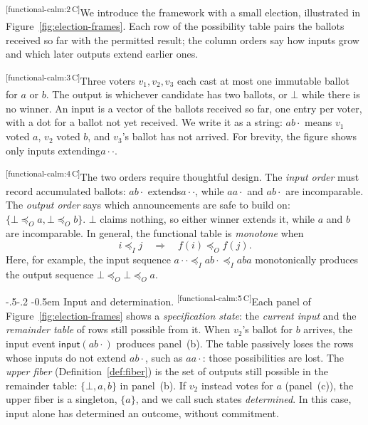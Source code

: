 \documentclass[sigconf]{cidr-2027}
\makeatletter
\theoremstyle{remark}
\renewcommand\paragraph{\@startsection{paragraph}{4}{\z@}%
  {-.5\baselineskip \@plus -2\p@ \@minus -.2\p@}%
  {-0.5em}%
  {\normalfont\bfseries}}
\newcommand{\InputOrd}{\preceq_I}
\newcommand{\OutputOrd}{\preceq_O}
\newcommand{\commitment}{commitment\xspace}
\newcommand{\inrel}{extends\xspace}          %
\newcommand{\inrelpart}{extending\xspace}    %
\newcommand{\ingrow}{grow\xspace}            %
\newcommand{\outrel}{extends\xspace}          %
\newcommand{\outrelbase}{extend\xspace}       %
\newcommand{\cxtag}[2]{\textsuperscript{\textsf{\tiny[#1\,#2]}}}
\makeatother
\begin{document}
\color{black!45}\cxtag{functional-calm:2}{C}We introduce the framework with a small election, illustrated in
Figure~\ref{fig:election-frames}.  Each row of the possibility table pairs
the ballots received so far with the permitted result; the column orders say how inputs \ingrow and which later outputs \outrelbase earlier ones.\color{black}

\color{black!45}\cxtag{functional-calm:3}{C}Three voters $v_1,v_2,v_3$ each cast at most one immutable ballot for $a$ or
$b$.  The output is whichever candidate has two ballots, or $\bot$ while there
is no winner.  An input is a vector of the ballots received so far, one entry per voter, with a
dot for a ballot not yet received.  We write it as a string: $ab\cdot$ means
$v_1$ voted $a$, $v_2$ voted $b$, and $v_3$'s ballot has not arrived.  For brevity,
the figure shows only inputs \inrelpart $a\cdot\cdot$.\color{black}

\color{black!45}\cxtag{functional-calm:4}{C}The two orders require thoughtful design.  The \emph{input order}
must record accumulated ballots: $ab\cdot$ \inrel $a\cdot\cdot$, while
$aa\cdot$ and $ab\cdot$ are incomparable.  The \emph{output order} says which
announcements are safe to build on: $\{\bot \OutputOrd a, \bot \OutputOrd b\}$.
$\bot$ claims nothing, so either winner
\outrel it, while $a$ and $b$ are incomparable.  In general, the functional table is \emph{monotone}
when
\[
  i\InputOrd j\quad\Longrightarrow\quad f(i)\OutputOrd f(j).
\]
Here, for example, the input sequence $a\cdot\cdot\InputOrd ab\cdot\InputOrd aba$
monotonically produces the output sequence $\bot\OutputOrd\bot\OutputOrd a$.\color{black}

\paragraph{Input and determination.}
\color{black!45}\cxtag{functional-calm:5}{C}Each panel of Figure~\ref{fig:election-frames} shows a \emph{specification
state}: the \emph{current input} and the \emph{remainder table} of rows still
possible from it.  When $v_2$'s ballot for $b$ arrives, the input event
$\mathsf{input}(ab\cdot)$ produces panel~(b).  The table passively loses the rows
whose inputs do not extend $ab\cdot$, such as $aa\cdot$: those possibilities are
lost.  The \emph{upper fiber} (Definition~\ref{def:fiber}) is the set of outputs still possible in the
remainder table: $\{\bot,a,b\}$ in panel~(b).  If $v_2$ instead votes for $a$
(panel~(c)), the upper fiber is a singleton, $\{a\}$, and we call such
states \emph{determined}.  In this case, input alone has determined an outcome,
without \commitment.\color{black}
\end{document}
